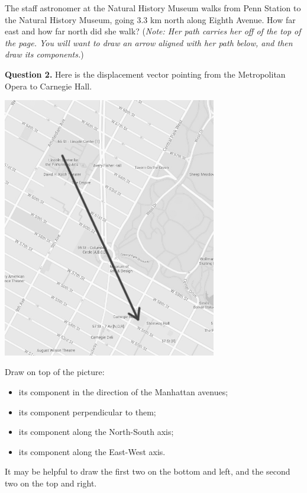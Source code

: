 \documentclass[12pt]{article}
\newcommand{\BI}{\begin{itemize}}
\newcommand{\EI}{\end{itemize}}
\def\BS{\bigskip}
\begin{document}
The staff astronomer at the Natural History Museum walks from Penn Station to the Natural History Museum, going 3.3 km north along Eighth Avenue. How far east and how far north did she walk? ({\it Note: Her path carries her off of the top of the page. You will want to draw an arrow aligned with her path below, and then draw its components.})

\vspace{3in}

	


\newpage


{\bf Question 2.} Here is the displacement vector pointing from the Metropolitan Opera to Carnegie Hall.
	\BS
	
	\begin{center}
		
		
		\includegraphics[width=0.7\textwidth]{manhattan-2.png}
		
		
	\end{center}
	
	Draw on top of the picture:
	
	\BI
	\item its component in the direction of the Manhattan avenues;
	\item its component perpendicular to them;
	\item its component along the North-South axis;
	\item its component along the East-West axis.
	\EI

	
	It may be helpful to draw the first two on the bottom and left, and the second two on the top and right.
	\vspace{1in}
	\vspace{3in}	
\end{document}
